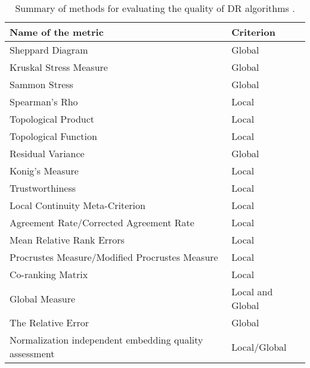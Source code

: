 \documentclass[12pt]{article}
\begin{document}
\begin{table}[ht]
\centering
\caption{Summary of methods for evaluating the quality of DR algorithms \cite{Gracia:2014}.}
\begin{tabular}{|l|l|}
\hline
\textbf{Name of the metric}                                           & \textbf{Criterion}   \\ \hline
Sheppard Diagram                                                 & Global                                       \\ \hline
Kruskal Stress Measure                                            & Global                                       \\ \hline
Sammon Stress                                              & Global                                       \\ \hline
Spearman's Rho                                             & Local                                        \\ \hline
Topological Product                                       & Local                                        \\ \hline
Topological Function                                      & Local                                        \\ \hline
Residual Variance                                       & Global                                       \\ \hline
Konig's Measure                                            & Local                                        \\ \hline
Trustworthiness                                                   & Local                                        \\ \hline
Local Continuity Meta-Criterion                          & Local                                        \\ \hline
Agreement Rate/Corrected Agreement Rate      & Local                                        \\ \hline
Mean Relative Rank Errors                                     & Local                                        \\ \hline
Procrustes Measure/Modified Procrustes Measure & Local                                        \\ \hline
Co-ranking Matrix                                                & Local                         \\ \hline
Global Measure                                             & Local and Global                             \\ \hline
The Relative Error                                        & Global                                       \\ \hline
Normalization independent embedding quality assessment        & Local/Global                                 \\ \hline
\end{tabular}
\end{table}
\end{document}

